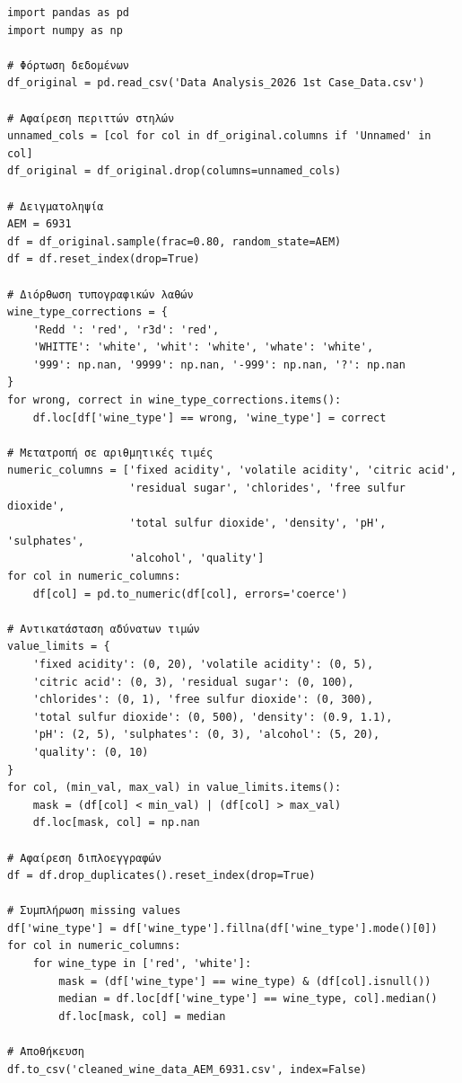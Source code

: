 \documentclass[12pt,a4paper]{article}
\begin{document}
\begin{lstlisting}[caption={Πλήρης κώδικας καθαρισμού δεδομένων}]
import pandas as pd
import numpy as np

# Φόρτωση δεδομένων
df_original = pd.read_csv('Data Analysis_2026 1st Case_Data.csv')

# Αφαίρεση περιττών στηλών
unnamed_cols = [col for col in df_original.columns if 'Unnamed' in col]
df_original = df_original.drop(columns=unnamed_cols)

# Δειγματοληψία
AEM = 6931
df = df_original.sample(frac=0.80, random_state=AEM)
df = df.reset_index(drop=True)

# Διόρθωση τυπογραφικών λαθών
wine_type_corrections = {
    'Redd ': 'red', 'r3d': 'red',
    'WHITTE': 'white', 'whit': 'white', 'whate': 'white',
    '999': np.nan, '9999': np.nan, '-999': np.nan, '?': np.nan
}
for wrong, correct in wine_type_corrections.items():
    df.loc[df['wine_type'] == wrong, 'wine_type'] = correct

# Μετατροπή σε αριθμητικές τιμές
numeric_columns = ['fixed acidity', 'volatile acidity', 'citric acid',
                   'residual sugar', 'chlorides', 'free sulfur dioxide',
                   'total sulfur dioxide', 'density', 'pH', 'sulphates',
                   'alcohol', 'quality']
for col in numeric_columns:
    df[col] = pd.to_numeric(df[col], errors='coerce')

# Αντικατάσταση αδύνατων τιμών
value_limits = {
    'fixed acidity': (0, 20), 'volatile acidity': (0, 5),
    'citric acid': (0, 3), 'residual sugar': (0, 100),
    'chlorides': (0, 1), 'free sulfur dioxide': (0, 300),
    'total sulfur dioxide': (0, 500), 'density': (0.9, 1.1),
    'pH': (2, 5), 'sulphates': (0, 3), 'alcohol': (5, 20),
    'quality': (0, 10)
}
for col, (min_val, max_val) in value_limits.items():
    mask = (df[col] < min_val) | (df[col] > max_val)
    df.loc[mask, col] = np.nan

# Αφαίρεση διπλοεγγραφών
df = df.drop_duplicates().reset_index(drop=True)

# Συμπλήρωση missing values
df['wine_type'] = df['wine_type'].fillna(df['wine_type'].mode()[0])
for col in numeric_columns:
    for wine_type in ['red', 'white']:
        mask = (df['wine_type'] == wine_type) & (df[col].isnull())
        median = df.loc[df['wine_type'] == wine_type, col].median()
        df.loc[mask, col] = median

# Αποθήκευση
df.to_csv('cleaned_wine_data_AEM_6931.csv', index=False)
\end{lstlisting}
\end{document}
